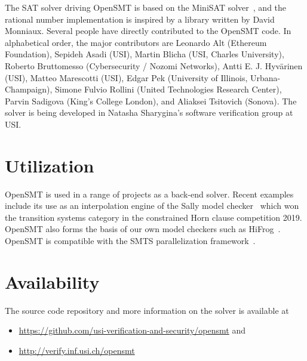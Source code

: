 \documentclass{easychair}
\begin{document}
The SAT solver driving OpenSMT is based on the MiniSAT
solver~\cite{EenS:SAT03}, and the rational number implementation is
inspired by a library written by David Monniaux.  Several people have
directly contributed to the OpenSMT code.  In alphabetical order, the
major contributors are
%
Leonardo Alt (Ethereum Foundation),
Sepideh Asadi (USI),
Martin Blicha (USI, Charles University),
Roberto Bruttomesso (Cybersecurity / Nozomi Networks),
Antti E. J. Hyv{\"a}rinen (USI),
Matteo Marescotti (USI),
Edgar Pek (University of Illinois, Urbana-Champaign),
Simone Fulvio Rollini (United Technologies Research Center),
Parvin Sadigova (King's College London), and
Aliaksei Tsitovich (Sonova).
%
The solver is being developed in Natasha Sharygina's software
verification group at USI.

\section{Utilization}

OpenSMT is used in a range of projects as a back-end solver.  Recent
examples include its use as an interpolation engine of the Sally model
checker~\cite{JovanovicD:FMCAD16} which won the transition systems
category in the constrained Horn clause competition 2019.  OpenSMT also
forms the basis of our own model checkers such as
HiFrog~\cite{AltACMFHS17}.  OpenSMT is compatible with the SMTS
parallelization framework~\cite{MarescottiHS18}.

\section{Availability}
The source code repository and more information on the solver is
available at

\begin{itemize}
    \item \url{https://github.com/usi-verification-and-security/opensmt}
        and
    \item \url{http://verify.inf.usi.ch/opensmt}
\end{itemize}

\iffalse
in chronological order, work on interpolation 
algorithms~\cite{BlichaHKS19,AltHAS17,JancikAFHKS16,AsadiBFHESC18}
and parallel SMT 
solving~\cite{HyvarinenMSCS18,MarescottiHS18,HyvarinenMS:SAT15}.
OpenSMT2 is
used as the back-end in model-checking tools
HiFrog~\cite{AltACMFHS17},
eVolCheck~\cite{FSS_TACAS13}, 
FunFrog~\cite{SFS_ATVA12}, and
PeRIPLO~\cite{RolliniAFHS:LPAR2013,AltFHS:VSTTE2015}.
OpenSMT2 is a supported engine in the parallel 
solving framework SMTS~\cite{MarescottiHS16}.

\section{Acknowledgements}
We thank everyone who helped
developing OpenSMT2. In particular,
Leonardo Alt,
Sepideh Asadi,
Martin Blicha,
Roberto Bruttomesso,
Antti E. J. Hyv{\"a}rinen,
Matteo Marescotti,
Edgar Pek,
Simone Fulvio Rollini, 
Parvin Sadigova,
Natasha Sharygina,
Aliaksei Tsitovich.
\fi



\end{document}
